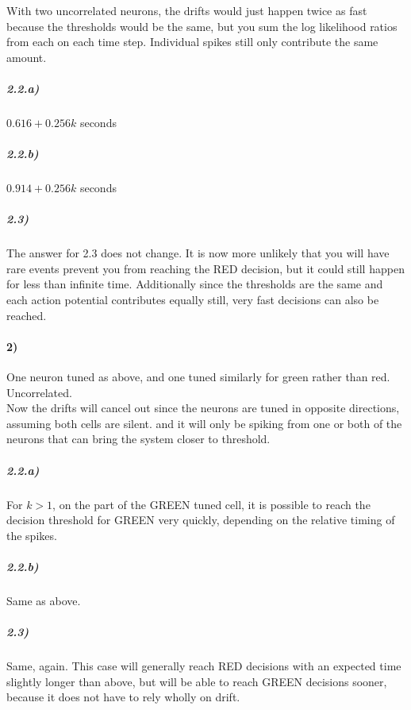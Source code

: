 \documentclass[10pt,letter]{article}
\begin{document}
With two uncorrelated neurons, the drifts would just happen twice as fast because the thresholds
 would be the same, but you sum the log likelihood ratios from each on each time step.  Individual
 spikes still only contribute the same amount.

\subparagraph{2.2.a)} $0.616 + 0.256 k$ seconds 

\subparagraph{2.2.b)} $0.914 + 0.256 k$ seconds 

\subparagraph{2.3)} The answer for 2.3 does not change. It is now more unlikely that you will have 
rare events prevent you from reaching the RED decision, but it could still happen for less than 
infinite time.  Additionally since the thresholds are the same and each action potential contributes 
equally still, very fast decisions can also be reached.

\paragraph{2)} One neuron tuned as above, and one tuned similarly for green rather than 
    red. Uncorrelated. \\

Now the drifts will cancel out since the neurons are tuned in opposite directions, assuming both 
cells are silent.  and it will only 
be spiking from one or both of the neurons that can bring the system closer to threshold.

\subparagraph{2.2.a)} For $k > 1$, on the part of the GREEN tuned cell, it is possible to reach the 
decision threshold for GREEN very quickly, depending on the relative timing of the spikes.

\subparagraph{2.2.b)} Same as above.

\subparagraph{2.3)} Same, again. This case will generally reach RED decisions with an expected time 
slightly longer than above, but will be able to reach GREEN decisions sooner, because it does not 
have to rely wholly on drift.
\end{document}
